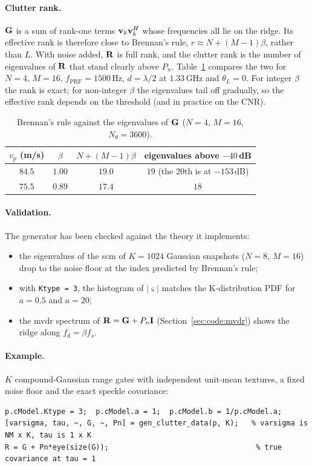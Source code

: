 \documentclass{article}
\begin{document}
\paragraph{Clutter rank.} $\mathbf{G}$ is a sum of rank-one terms $\vb v_k\vb v_k^{H}$ whose frequencies all lie on the ridge. Its effective rank is therefore close to Brennan's rule, $r\approx N+(M-1)\beta$, rather than $L$. With noise added, $\mathbf{R}$ is full rank, and the clutter rank is the number of eigenvalues of $\mathbf{R}$ that stand clearly above $P_n$. Table~\ref{tab:code:rank} compares the two for $N=4$, $M=16$, $f_\mathrm{PRF}=1500$\,Hz, $d=\lambda/2$ at $1.33$\,GHz and $\theta_L=0$. For integer $\beta$ the rank is exact; for non-integer $\beta$ the eigenvalues tail off gradually, so the effective rank depends on the threshold (and in practice on the CNR).

\begin{table}[ht]
  \centering
  \caption{Brennan's rule against the eigenvalues of $\mathbf{G}$ ($N=4$, $M=16$, $N_\theta=3600$).}
  \label{tab:code:rank}
  \begin{tabular}{@{}cccc@{}}
    \toprule
    $v_p$ (m/s) & $\beta$ & $N+(M-1)\beta$ & eigenvalues above $-40$\,dB \\
    \midrule
    $84.5$ & $1.00$ & $19.0$ & $19$ (the 20th is at $-153$\,dB) \\
    $75.5$ & $0.89$ & $17.4$ & $18$ \\
    \bottomrule
  \end{tabular}
\end{table}

\paragraph{Validation.} The generator has been checked against the theory it implements:
\begin{itemize}
  \item the eigenvalues of the \gls{scm} of $K=1024$ Gaussian snapshots ($N=8$, $M=16$) drop to the noise floor at the index predicted by Brennan's rule;
  \item with \texttt{Ktype = 3}, the histogram of $|\varsigma|$ matches the K-distribution PDF for $a=0.5$ and $a=20$;
  \item the \gls{mvdr} spectrum of $\mathbf{R}=\mathbf{G}+P_n\mathbf{I}$ (Section~\ref{sec:code:mvdr}) shows the ridge along $f_d=\beta f_s$.
\end{itemize}

\paragraph{Example.} $K$ compound-Gaussian range gates with independent unit-mean textures, a fixed noise floor and the exact speckle covariance:
\begin{lstlisting}[style=matlab]
p.cModel.Ktype = 3;  p.cModel.a = 1;  p.cModel.b = 1/p.cModel.a;
[varsigma, tau, ~, G, ~, Pn] = gen_clutter_data(p, K);   % varsigma is NM x K, tau is 1 x K
R = G + Pn*eye(size(G));                                  % true covariance at tau = 1
\end{lstlisting}
\end{document}

